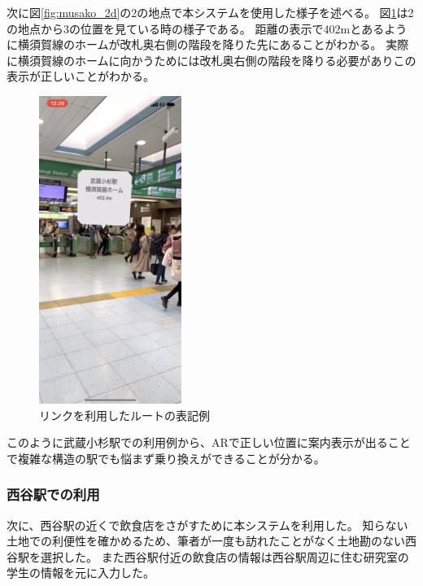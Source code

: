次に図\ref{fig:musako_2d}の\textcircled{\scriptsize{2}}の地点で本システムを使用した様子を述べる。
図\ref{fig:musako_jr_ar1}は\textcircled{\scriptsize{2}}の地点から\textcircled{\scriptsize{3}}の位置を見ている時の様子である。
距離の表示で402mとあるように横須賀線のホームが改札奥右側の階段を降りた先にあることがわかる。
実際に横須賀線のホームに向かうためには改札奥右側の階段を降りる必要がありこの表示が正しいことがわかる。
\begin{figure}[H]
  \centering
  \includegraphics[height=100mm]{images/musako_jr_ar1.png}
  \caption{リンクを利用したルートの表記例} \label{fig:musako_jr_ar1}
\end{figure}
このように武蔵小杉駅での利用例から、ARで正しい位置に案内表示が出ることで複雑な構造の駅でも悩まず乗り換えができることが分かる。


\subsubsection{西谷駅での利用}
次に、西谷駅の近くで飲食店をさがすために本システムを利用した。
知らない土地での利便性を確かめるため、筆者が一度も訪れたことがなく土地勘のない西谷駅を選択した。
また西谷駅付近の飲食店の情報は西谷駅周辺に住む研究室の学生の情報を元に入力した。

